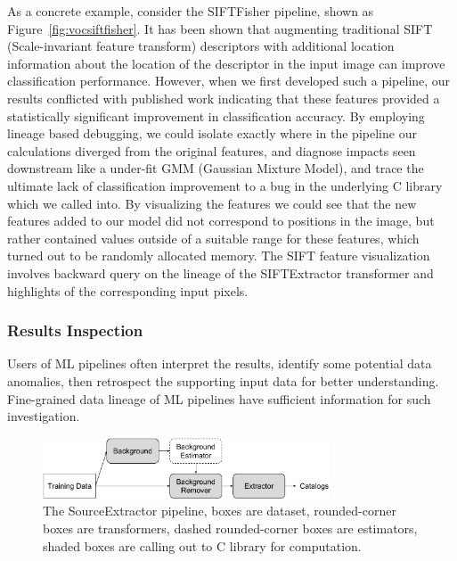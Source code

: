 \documentclass{sig-alternate}
\begin{document}
As a concrete example, consider the SIFTFisher pipeline, shown as Figure~\ref{fig:vocsiftfisher}. 
It has been shown that augmenting traditional SIFT (Scale-invariant feature transform) descriptors with additional location information about the location of the descriptor in the input image can improve classification performance.
However, when we first developed such a pipeline, our results conflicted with published work indicating that these features provided a statistically significant improvement in classification accuracy.
By employing lineage based debugging, we could isolate exactly where in the pipeline our calculations diverged from the original features, and diagnose impacts seen downstream like a under-fit GMM (Gaussian Mixture Model), and trace the ultimate lack of classification improvement to a bug in the underlying C library which we called into.
By visualizing the features we could see that the new features added to our model did not correspond to positions in the image, but rather contained values outside of a suitable range for these features, which turned out to be randomly allocated memory. The SIFT feature visualization involves backward query on the lineage of the SIFTExtractor transformer and highlights of the corresponding input pixels.


\subsubsection{Results Inspection}
Users of ML pipelines often interpret the results, identify some potential data anomalies, then retrospect the supporting input data for better understanding.
Fine-grained data lineage of ML pipelines have sufficient information for such investigation.

\begin{figure}[h]
\begin{center}
    \includegraphics[width=85mm]{pictures/SourceExtractor}
    \caption {The SourceExtractor pipeline, boxes are dataset, rounded-corner boxes are transformers, dashed rounded-corner boxes are estimators, shaded boxes are calling out to C library for computation.
    \label{fig:sourceextractor}
}
\end{center}
\end{figure}
\end{document}
